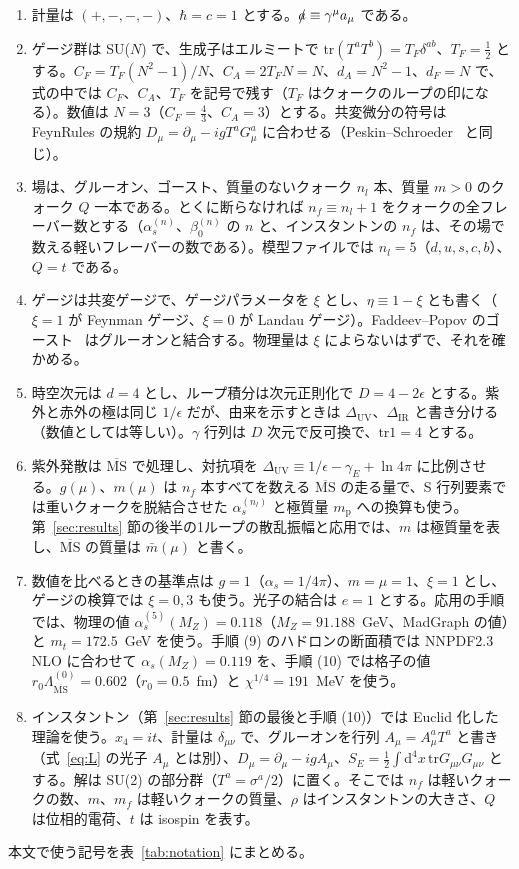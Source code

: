 \documentclass[a4paper,10pt]{ltjsarticle}
\newcommand{\dd}{\mathrm{d}}
\newcommand{\MSbar}{\overline{\mathrm{MS}}}
\newcommand{\DUV}{\Delta_{\mathrm{UV}}}
\newcommand{\DIR}{\Delta_{\mathrm{IR}}}
\newcommand{\tr}{\mathrm{tr}}
\begin{document}
\begin{enumerate}
\item 計量は $(+,-,-,-)$、$\hbar=c=1$ とする。$\slashed a\equiv\gamma^\mu a_\mu$ である。
\item ゲージ群は SU($N$) で、生成子はエルミートで $\tr(T^aT^b)=T_F\delta^{ab}$、$T_F=\frac12$ とする。$C_F=T_F(N^2-1)/N$、$C_A=2T_FN=N$、$d_A=N^2-1$、$d_F=N$ で、式の中では $C_F$、$C_A$、$T_F$ を記号で残す（$T_F$ はクォークのループの印になる）。数値は $N=3$（$C_F=\frac43$、$C_A=3$）とする。共変微分の符号は FeynRules の規約 $D_\mu=\partial_\mu-igT^aG^a_\mu$ に合わせる（Peskin--Schroeder~\cite{peskin} と同じ）。
\item 場は、グルーオン、ゴースト、質量のないクォーク $n_l$ 本、質量 $m>0$ のクォーク $Q$ 一本である。とくに断らなければ $n_f\equiv n_l+1$ をクォークの全フレーバー数とする（$\alpha_s^{(n)}$、$\beta_0^{(n)}$ の $n$ と、インスタントンの $n_f$ は、その場で数える軽いフレーバーの数である）。模型ファイルでは $n_l=5$（$d,u,s,c,b$）、$Q=t$ である。
\item ゲージは共変ゲージで、ゲージパラメータを $\xi$ とし、$\eta\equiv1-\xi$ とも書く（$\xi=1$ が Feynman ゲージ、$\xi=0$ が Landau ゲージ）。Faddeev--Popov のゴースト~\cite{fp} はグルーオンと結合する。物理量は $\xi$ によらないはずで、それを確かめる。
\item 時空次元は $d=4$ とし、ループ積分は次元正則化で $D=4-2\epsilon$ とする。紫外と赤外の極は同じ $1/\epsilon$ だが、由来を示すときは $\DUV$、$\DIR$ と書き分ける（数値としては等しい）。$\gamma$ 行列は $D$ 次元で反可換で、$\tr1=4$ とする。
\item 紫外発散は $\MSbar$ で処理し、対抗項を $\DUV\equiv1/\epsilon-\gamma_E+\ln4\pi$ に比例させる。$g(\mu)$、$m(\mu)$ は $n_f$ 本すべてを数える $\MSbar$ の走る量で、S 行列要素では重いクォークを脱結合させた $\alpha_s^{(n_l)}$ と極質量 $m_{\mathrm p}$ への換算も使う。第~\ref{sec:results} 節の後半の1ループの散乱振幅と応用では、$m$ は極質量を表し、$\MSbar$ の質量は $\bar m(\mu)$ と書く。
\item 数値を比べるときの基準点は $g=1$（$\alpha_s=1/4\pi$）、$m=\mu=1$、$\xi=1$ とし、ゲージの検算では $\xi=0,3$ も使う。光子の結合は $e=1$ とする。応用の手順では、物理の値 $\alpha_s^{(5)}(M_Z)=0.118$（$M_Z=91.188$~GeV、MadGraph の値）と $m_t=172.5$~GeV を使う。手順 (9) のハドロンの断面積では NNPDF2.3 NLO に合わせて $\alpha_s(M_Z)=0.119$ を、手順 (10) では格子の値 $r_0\Lambda^{(0)}_{\MSbar}=0.602$（$r_0=0.5$~fm）と $\chi^{1/4}=191$~MeV を使う。
\item インスタントン（第~\ref{sec:results} 節の最後と手順 (10)）では Euclid 化した理論を使う。$x_4=it$、計量は $\delta_{\mu\nu}$ で、グルーオンを行列 $A_\mu=A^a_\mu T^a$ と書き（式~\eqref{eq:L} の光子 $A_\mu$ とは別）、$D_\mu=\partial_\mu-igA_\mu$、$S_E=\frac12\int\dd^4x\,\tr G_{\mu\nu}G_{\mu\nu}$ とする。解は SU(2) の部分群（$T^a=\sigma^a/2$）に置く。そこでは $n_f$ は軽いクォークの数、$m$、$m_f$ は軽いクォークの質量、$\rho$ はインスタントンの大きさ、$Q$ は位相的電荷、$t$ は isospin を表す。
\end{enumerate}
本文で使う記号を表~\ref{tab:notation} にまとめる。
\end{document}
